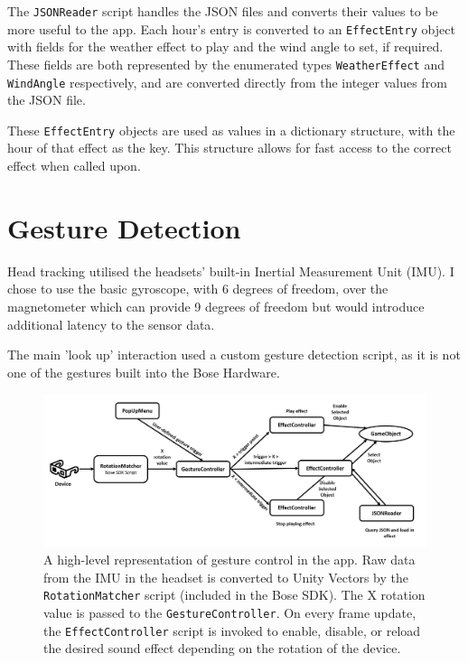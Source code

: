 \documentclass{l4proj}
\begin{document}
The \texttt{JSONReader} script handles the JSON files and converts their values to be more useful to the app. Each hour's entry is converted to an \texttt{EffectEntry} object with fields for the weather effect to play and the wind angle to set, if required. These fields are both represented by the enumerated types \texttt{WeatherEffect} and \texttt{WindAngle} respectively, and are converted directly from the integer values from the JSON file.

These \texttt{EffectEntry} objects are used as values in a dictionary structure, with the hour of that effect as the key. This structure allows for fast access to the correct effect when called upon.

\section{Gesture Detection}
Head tracking utilised the headsets' built-in Inertial Measurement Unit (IMU). I chose to use the basic gyroscope, with 6 degrees of freedom,  over the magnetometer which can provide 9 degrees of freedom but would introduce additional latency to the sensor data.

The main 'look up' interaction used a custom gesture detection script, as it is not one of the gestures built into the Bose Hardware.

\begin{figure}[hbt]
    \centering
    \includegraphics[width=\linewidth]{images/flow_diagram.png}
    \caption{A high-level representation of gesture control in the app. Raw data from the IMU in the headset is converted to Unity Vectors by the \texttt{RotationMatcher} script (included in the Bose SDK). The X rotation value is passed to the \texttt{GestureController}. On every frame update, the \texttt{EffectController} script is invoked to enable, disable, or reload the desired sound effect depending on the rotation of the device.}
    \label{fig:gesture_flow_diagram}
\end{figure}
\end{document}
